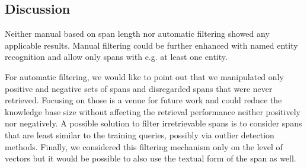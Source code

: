 \clearpage

\subsection{Discussion}

Neither manual based on span length nor automatic filtering showed any applicable results.
Manual filtering could be further enhanced with named entity recognition and allow only spans with e.g. at least one entity.

For automatic filtering, we would like to point out that we manipulated only positive and negative sets of spans and disregarded spans that were never retrieved.
Focusing on those is a venue for future work and could reduce the knowledge base size without affecting the retrieval performance neither positively nor negatively.
A possible solution to filter irretrievable spans is to consider spans that are least similar to the training queries, possibly via outlier detection methods.
Finally, we considered this filtering mechanism only on the level of vectors but it would be possible to also use the textual form of the span as well.